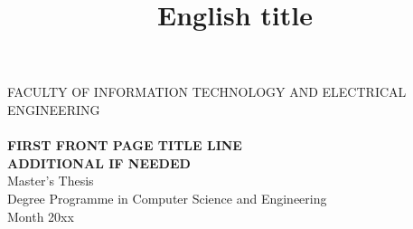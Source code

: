 \documentclass[a4paper, 12pt,titlepage]{dithesis}
\title{English title}
\begin{document}
    \begin{titlepage}
        {\sffamily\fontsize{9}{1pt}\selectfont FACULTY OF INFORMATION TECHNOLOGY AND ELECTRICAL ENGINEERING\\}
        \vspace{65 mm}
        {\textbf{\fontsize{16}{19pt}\selectfont \getfirstname\ \getlastname }\\}
        \vspace{15 mm}
        {\textbf{\fontsize{18}{22pt}\selectfont FIRST FRONT PAGE TITLE LINE\\ADDITIONAL IF NEEDED\\}}
        \vspace{60 mm}
        {\fontsize{14}{17}\selectfont Master's Thesis \\Degree Programme in Computer Science and Engineering \\ Month 20xx\\}
    \end{titlepage}
\end{document}
